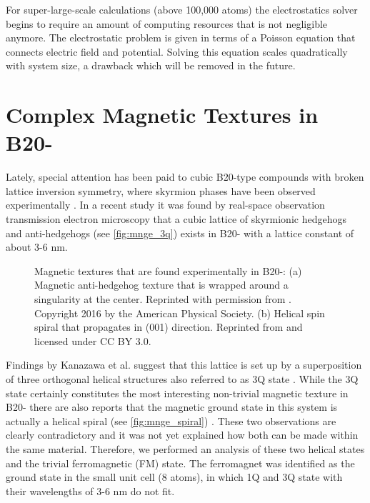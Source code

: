 \documentclass[graybox]{svmult}
\begin{document}
For super-large-scale calculations (above 100,000 atoms) the electrostatics solver begins
to require an amount of computing resources that is not negligible anymore. 
The electrostatic problem is given in terms of a Poisson equation that connects electric field and potential. 
Solving this equation scales quadratically with system size, a drawback which will be removed in the future.

\section{Complex Magnetic Textures in B20-}
\label{sec:mnge}
Lately, special attention has been paid to cubic B20-type compounds with broken lattice inversion symmetry,
where skyrmion phases have been observed experimentally \cite{nagaosa_topological_2013}.
In a recent study \cite{tanigaki_real-space_2015} it was 
found by real-space observation transmission electron microscopy that a cubic lattice of skyrmionic hedgehogs
and anti-hedgehogs (see \cref{fig:mnge_3q}) exists in B20- 
with a lattice constant of about 3-6 nm.
\begin{figure}[htb]
	\hfill
	\hfill
 \caption{Magnetic textures that are found experimentally in B20-: (a) 
	Magnetic anti-hedgehog texture that is wrapped around a singularity at the center.
	Reprinted with permission from \cite{zhang_electric_2016}. Copyright 2016 by
	the American Physical Society. (b) Helical
	spin spiral that propagates in (001) direction. Reprinted from \cite{rybakov_new_2016} and
	licensed under CC BY 3.0.}
\end{figure}
Findings by Kanazawa et al. suggest that this lattice is set up by a superposition of three orthogonal
helical structures also referred to as 3Q state \cite{kanazawa_noncentrosymmetric_2017}. 
While the 3Q state certainly constitutes the most interesting non-trivial magnetic texture 
in B20- there are also reports that the magnetic ground state in this system is
actually a helical spiral (see \cref{fig:mnge_spiral}) \cite{yaouanc_magnetic_2017}.
These two observations are clearly contradictory and it was not yet explained how
both can be made within the same material.
Therefore, we performed
an analysis of these two helical states and the trivial ferromagnetic (FM) state.
The ferromagnet was identified as the ground state in the small unit cell (8 atoms), 
in which 1Q and 3Q state with their wavelengths of
3-6 nm do not fit.
\end{document}
